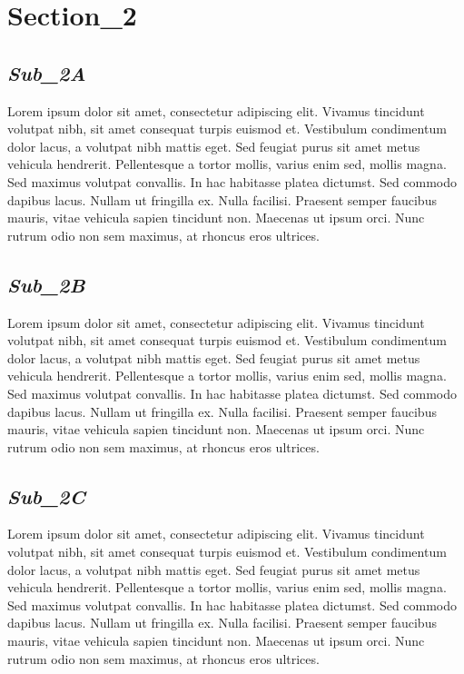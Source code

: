 \documentclass[a4paper]{article}
\begin{document}
\section*{Section\_2}
	\begin{minipage}{0.9\textwidth}
		
		\subsection*{\textit{Sub\_2A}}
		Lorem ipsum dolor sit amet, consectetur adipiscing elit. Vivamus tincidunt volutpat nibh, sit amet consequat turpis euismod et. Vestibulum condimentum dolor lacus, a volutpat nibh mattis eget. Sed feugiat purus sit amet metus vehicula hendrerit. Pellentesque a tortor mollis, varius enim sed, mollis magna. Sed maximus volutpat convallis. In hac habitasse platea dictumst. Sed commodo dapibus lacus. Nullam ut fringilla ex. Nulla facilisi. Praesent semper faucibus mauris, vitae vehicula sapien tincidunt non. Maecenas ut ipsum orci. Nunc rutrum odio non sem maximus, at rhoncus eros ultrices.
		
		\subsection*{\textit{Sub\_2B}}
		Lorem ipsum dolor sit amet, consectetur adipiscing elit. Vivamus tincidunt volutpat nibh, sit amet consequat turpis euismod et. Vestibulum condimentum dolor lacus, a volutpat nibh mattis eget. Sed feugiat purus sit amet metus vehicula hendrerit. Pellentesque a tortor mollis, varius enim sed, mollis magna. Sed maximus volutpat convallis. In hac habitasse platea dictumst. Sed commodo dapibus lacus. Nullam ut fringilla ex. Nulla facilisi. Praesent semper faucibus mauris, vitae vehicula sapien tincidunt non. Maecenas ut ipsum orci. Nunc rutrum odio non sem maximus, at rhoncus eros ultrices.
		
		\subsection*{\textit{Sub\_2C}}
		Lorem ipsum dolor sit amet, consectetur adipiscing elit. Vivamus tincidunt volutpat nibh, sit amet consequat turpis euismod et. Vestibulum condimentum dolor lacus, a volutpat nibh mattis eget. Sed feugiat purus sit amet metus vehicula hendrerit. Pellentesque a tortor mollis, varius enim sed, mollis magna. Sed maximus volutpat convallis. In hac habitasse platea dictumst. Sed commodo dapibus lacus. Nullam ut fringilla ex. Nulla facilisi. Praesent semper faucibus mauris, vitae vehicula sapien tincidunt non. Maecenas ut ipsum orci. Nunc rutrum odio non sem maximus, at rhoncus eros ultrices.
		
	\end{minipage}
	
\end{document}
